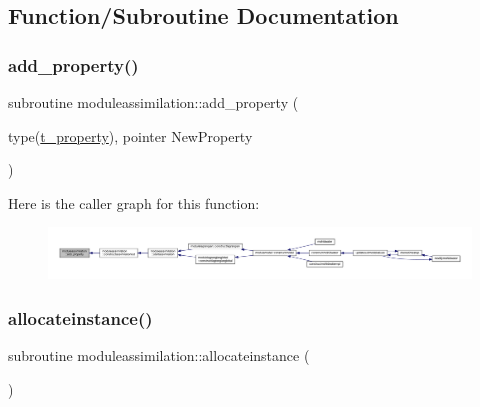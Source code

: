 \subsection{Function/\+Subroutine Documentation}
\mbox{\label{namespacemoduleassimilation_a59854402d2db7e0920208b8293922fc2}} 
\subsubsection{\texorpdfstring{add\+\_\+property()}{add\_property()}}
{\footnotesize\ttfamily subroutine moduleassimilation\+::add\+\_\+property (\begin{DoxyParamCaption}\item[{type(\mbox{\hyperlink{structmoduleassimilation_1_1t__property}{t\+\_\+property}}), pointer}]{New\+Property }\end{DoxyParamCaption})\hspace{0.3cm}{\ttfamily [private]}}

Here is the caller graph for this function\+:\nopagebreak
\begin{figure}[H]
\begin{center}
\leavevmode
\includegraphics[width=350pt]{namespacemoduleassimilation_a59854402d2db7e0920208b8293922fc2_icgraph}
\end{center}
\end{figure}
\mbox{\label{namespacemoduleassimilation_aad981de22073d1a61a32131d203265ca}} 
\subsubsection{\texorpdfstring{allocateinstance()}{allocateinstance()}}
{\footnotesize\ttfamily subroutine moduleassimilation\+::allocateinstance (\begin{DoxyParamCaption}{ }\end{DoxyParamCaption})\hspace{0.3cm}{\ttfamily [private]}}


